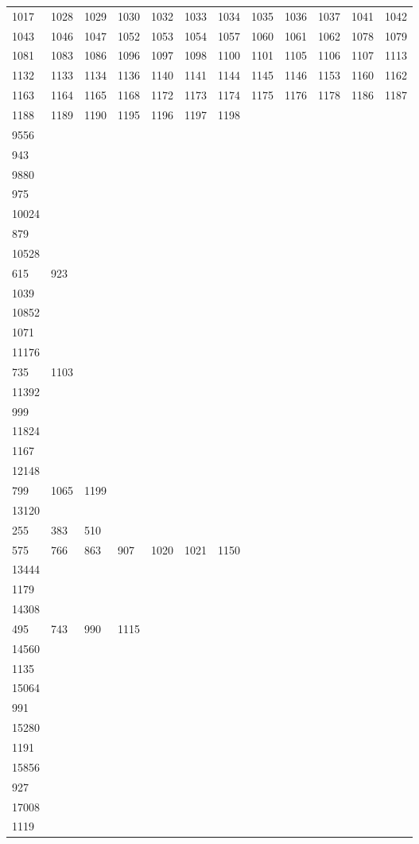 \begin{longtable}{llllllllllll}
1017& 1028& 1029& 1030& 1032& 1033& 1034& 1035& 1036& 1037& 1041& 1042\\
1043& 1046& 1047& 1052& 1053& 1054& 1057& 1060& 1061& 1062& 1078& 1079\\
1081& 1083& 1086& 1096& 1097& 1098& 1100& 1101& 1105& 1106& 1107& 1113\\
1132& 1133& 1134& 1136& 1140& 1141& 1144& 1145& 1146& 1153& 1160& 1162\\
1163& 1164& 1165& 1168& 1172& 1173& 1174& 1175& 1176& 1178& 1186& 1187\\
1188& 1189& 1190& 1195& 1196& 1197& 1198& \\
9556&&&&&&&&&&&\\
943& \\
9880&&&&&&&&&&&\\
975& \\
10024&&&&&&&&&&&\\
879& \\
10528&&&&&&&&&&&\\
615& 923\\
1039& \\
10852&&&&&&&&&&&\\
1071& \\
11176&&&&&&&&&&&\\
735& 1103& \\
11392&&&&&&&&&&&\\
999& \\
11824&&&&&&&&&&&\\
1167& \\
12148&&&&&&&&&&&\\
799& 1065& 1199& \\
13120&&&&&&&&&&&\\
255& 383& 510\\
575& 766& 863& 907& 1020& 1021& 1150& \\
13444&&&&&&&&&&&\\
1179& \\
14308&&&&&&&&&&&\\
495& 743& 990& 1115\\
14560&&&&&&&&&&&\\
1135& \\
15064&&&&&&&&&&&\\
991& \\
15280&&&&&&&&&&&\\
1191& \\
15856&&&&&&&&&&&\\
927& \\
17008&&&&&&&&&&&\\
1119& \\

\end{longtable}
